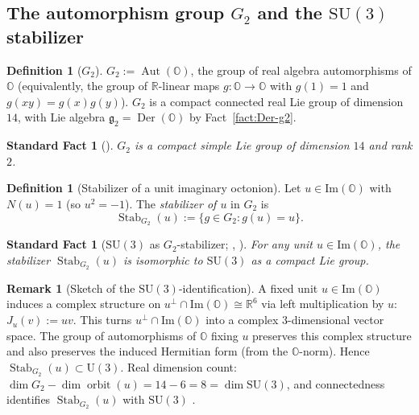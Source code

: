 \documentclass[11pt, a4paper]{amsart}
\newtheorem{fact}[theorem]{Standard Fact}
\theoremstyle{definition}
\newtheorem{definition}[theorem]{Definition}
\newtheorem{remark}[theorem]{Remark}
\newcommand{\R}{\mathbb{R}}
\newcommand{\OO}{\mathbb{O}}
\newcommand{\Der}{\operatorname{Der}}
\newcommand{\Aut}{\operatorname{Aut}}
\newcommand{\Stab}{\operatorname{Stab}}
\newcommand{\SU}{\mathrm{SU}}
\renewcommand{\Im}{\mathrm{Im}}
\begin{document}
\subsection{The automorphism group $G_2$ and the $\SU(3)$ stabilizer}

\begin{definition}[$G_2$]
\label{def:G2}
$G_2 := \Aut(\OO)$, the group of real algebra automorphisms of
$\OO$ (equivalently, the group of $\R$-linear maps $g \colon \OO
\to \OO$ with $g(1) = 1$ and $g(xy) = g(x) g(y)$). $G_2$ is a
compact connected real Lie group of dimension $14$, with Lie
algebra $\mathfrak{g}_2 = \Der(\OO)$ by
Fact~\ref{fact:Der-g2}.
\end{definition}

\begin{fact}[\cite{BaezOctonions}]
\label{fact:G2-14}
$G_2$ is a compact simple Lie group of dimension $14$ and rank $2$.
\end{fact}

\begin{definition}[Stabilizer of a unit imaginary octonion]
\label{def:stab-u}
Let $u \in \Im(\OO)$ with $N(u) = 1$ (so $u^2 = -1$). The
\emph{stabilizer of $u$} in $G_2$ is
\[
  \Stab_{G_2}(u) := \{g \in G_2 : g(u) = u\}.
\]
\end{definition}

\begin{fact}[$\SU(3)$ as $G_2$-stabilizer; \cite{BaezOctonions}, \cite{Macfarlane}]
\label{fact:SU3-stab}
For any unit $u \in \Im(\OO)$, the stabilizer
$\Stab_{G_2}(u)$ is isomorphic to $\SU(3)$ as a compact Lie group.
\end{fact}

\begin{remark}[Sketch of the $\SU(3)$-identification]
\label{rmk:SU3-sketch}
A fixed unit $u \in \Im(\OO)$ induces a complex structure on
$u^\perp \cap \Im(\OO) \cong \R^6$ via left multiplication by $u$:
$J_u(v) := uv$. This turns $u^\perp \cap \Im(\OO)$ into a complex
$3$-dimensional vector space. The group of automorphisms of $\OO$
fixing $u$ preserves this complex structure and also preserves the
induced Hermitian form (from the $\OO$-norm). Hence
$\Stab_{G_2}(u) \subset \mathrm{U}(3)$. Real dimension count:
$\dim G_2 - \dim \operatorname{orbit}(u) = 14 - 6 = 8 = \dim \SU(3)$,
and connectedness identifies $\Stab_{G_2}(u)$ with $\SU(3)$
\cite[\S 7]{BaezOctonions}.
\end{remark}

\end{document}
